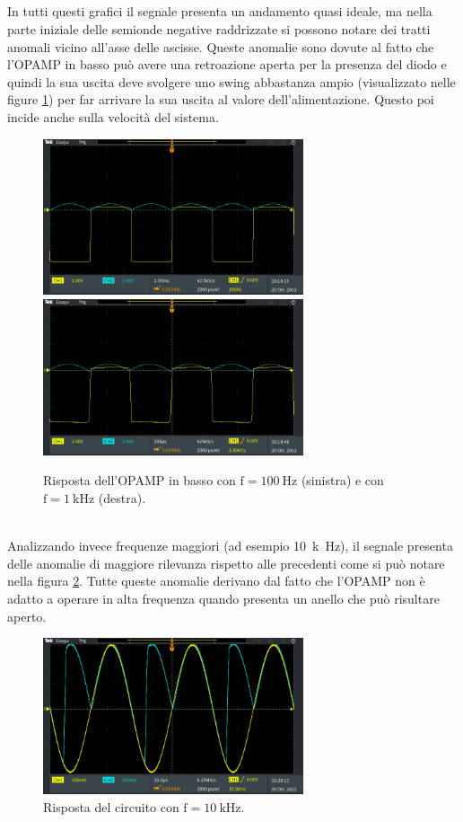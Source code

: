 \documentclass{report}
\begin{document}
\\\\\\
\\In tutti questi grafici il segnale presenta un andamento quasi ideale, ma nella parte iniziale delle semionde negative raddrizzate si possono notare dei tratti anomali vicino all'asse delle ascisse. Queste anomalie sono dovute al fatto che l'OPAMP in basso può avere una retroazione aperta per la presenza del diodo e quindi la sua uscita deve svolgere uno swing abbastanza ampio (visualizzato nelle figure \ref{figura:uscita111}) per far arrivare la sua uscita al valore dell'alimentazione. Questo poi incide anche sulla velocità del sistema.
\begin{figure}[h!]
	\centering
	\includegraphics[height=4.6cm]{immagini/TEK00002}
	\includegraphics[height=4.6cm]{immagini/TEK00004}
	\caption{Risposta dell'OPAMP in basso con $\mathrm{f= \SI{100}{\hertz}}$ (sinistra) e con $\mathrm{f= \SI{1}{k\hertz}}$ (destra).}
	\label{figura:uscita111}
\end{figure}
\\Analizzando invece frequenze maggiori (ad esempio \SI{10}{k\hertz}), il segnale presenta delle anomalie di maggiore rilevanza rispetto alle precedenti come si può notare nella figura \ref{figura:uscita12}. Tutte queste anomalie derivano dal fatto che l'OPAMP non è adatto a operare in alta frequenza quando presenta un anello che può risultare aperto.
\begin{figure}[h!]
	\centering
	\includegraphics[height=4.6cm]{immagini/TEK00008}
	\caption{Risposta del circuito con $\mathrm{f= \SI{10}{k\hertz}}$.}
	\label{figura:uscita12}
\end{figure}
\end{document}
